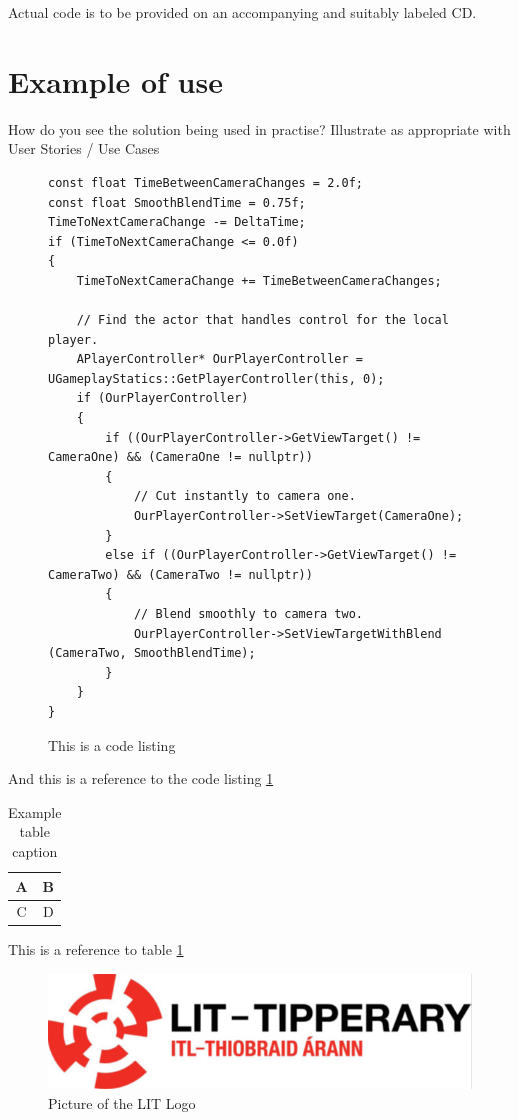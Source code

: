 \documentclass[12pt,a4paper,titlepage]{article}
\begin{document}
Actual code is to be provided on an accompanying and suitably labeled CD.

\section{Example of use}
How do you see the solution being used in practise? Illustrate as appropriate with User Stories / Use Cases 

\begin{figure}[H]
\begin{lstlisting}
const float TimeBetweenCameraChanges = 2.0f;
const float SmoothBlendTime = 0.75f;
TimeToNextCameraChange -= DeltaTime;
if (TimeToNextCameraChange <= 0.0f)
{
    TimeToNextCameraChange += TimeBetweenCameraChanges;

    // Find the actor that handles control for the local player.
    APlayerController* OurPlayerController = UGameplayStatics::GetPlayerController(this, 0);
    if (OurPlayerController)
    {
        if ((OurPlayerController->GetViewTarget() != CameraOne) && (CameraOne != nullptr))
        {
            // Cut instantly to camera one.
            OurPlayerController->SetViewTarget(CameraOne);
        }
        else if ((OurPlayerController->GetViewTarget() != CameraTwo) && (CameraTwo != nullptr))
        {
            // Blend smoothly to camera two.
            OurPlayerController->SetViewTargetWithBlend (CameraTwo, SmoothBlendTime);
        }
    }
}
\end{lstlisting}
	\caption{This is a code listing}
	\label{code:raig header file}
\end{figure}

And this is a reference to the code listing \ref{code:raig header file}


\begin{table}[H] %
\begin{center}

\begin{tabular}{ | c | c |}
\hline
A & B \\ 
\hline
C & D \\
\hline
\end{tabular}
\caption{Example table caption}
\label{table:x Example table}
\end{center}
\end{table}

This is a reference to table \ref{table:x Example table}

\begin{figure}[H]
	\centering
    	\includegraphics[width=\textwidth]{Figures/lit_logo}
	\caption{Picture of the LIT Logo}
	\label{fig:example figure and caption}
\end{figure}
\end{document}

